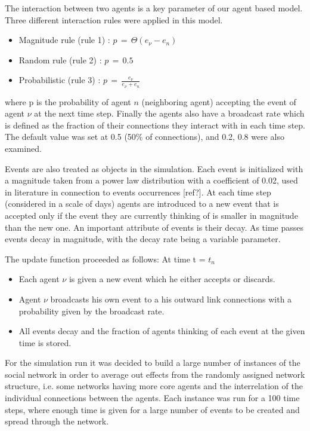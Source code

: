 \documentclass [12pt,a4paper,twoside]{article}
\begin{document}
The interaction between two agents is a key parameter of our agent based model. Three different interaction rules were applied in this model.
\begin{itemize}
\item Magnitude rule (rule 1) : $p\, = \,\Theta(e_{\nu}-e_n)$
\item Random rule (rule 2) : $p\,=\,0.5$
\item Probabilistic (rule 3) : $p\,=\, \frac{e_{\nu}}{e_{\nu}+e_n}$
\end{itemize}
where p is the probability of agent $n$ (neighboring agent) accepting the event of agent $\nu$ at the next time step. Finally the agents also have a broadcast rate which is defined as the fraction of their connections they interact with in each time step. The default value was set at 0.5 (50\% of connections), and 0.2, 0.8 were also examined.

Events are also treated as objects in the simulation. Each event is initialized with a magnitude taken from a power law distribution with a coefficient of 0.02, used in literature in connection to events occurrences [ref?]. At each time step (considered in a scale of days) agents are introduced to a new event that is accepted only if the event they are currently thinking of is smaller in magnitude than the new one. An important attribute of events is their decay. As time passes events decay in magnitude, with the decay rate being a variable parameter.

The update function proceeded as follows:
At time t = $t_n$
\begin{itemize}
\item Each agent $\nu$ is given a new event which he either accepts or discards.
\item Agent $\nu$ broadcasts his own event to a his outward link connections with a probability given by the broadcast rate.
\item All events decay and the fraction of agents thinking of each event at the given time is stored.
\end{itemize}

For the simulation run it was decided to build a large number of instances of the social network in order to average out effects from the randomly assigned network structure, i.e. some networks having more core agents and the interrelation of the individual connections between the agents. Each instance was run for a 100 time steps, where enough time is given for a large number of events to be created and spread through the network. 
\end{document}
